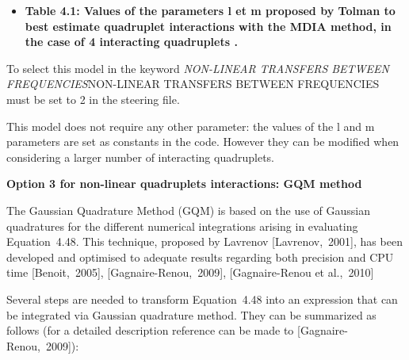 \begin{itemize}
\item  \textbf{Table 4.1: Values of the parameters l et m proposed by Tolman to best estimate quadruplet interactions with the MDIA method, in the case of 4 interacting quadruplets \cite{Tolman2004}.}
\end{itemize}

 To select this model in \tomawac the keyword \textit{NON-LINEAR TRANSFERS BETWEEN FREQUENCIES}NON-LINEAR TRANSFERS BETWEEN FREQUENCIES must be set to 2 in the steering file.

 This model does not require any other parameter: the values of the l and m parameters are set as constants in the code. However they can be modified when considering a larger number of interacting quadruplets.


{\bf  Option 3 for non-linear quadruplets interactions: GQM method}

 The Gaussian Quadrature Method (GQM) is based on the use of Gaussian quadratures for the different numerical integrations arising in evaluating Equation~4.48. This technique, proposed by Lavrenov [Lavrenov,~2001], has been developed and optimised to adequate results regarding both precision and CPU time [Benoit,~2005], [Gagnaire-Renou,~2009], [Gagnaire-Renou et al.,~2010]

 Several steps are needed to transform Equation~4.48 into an expression that can be integrated via Gaussian quadrature method. They can be summarized as follows (for a detailed description reference can be made to [Gagnaire-Renou,~2009]):

